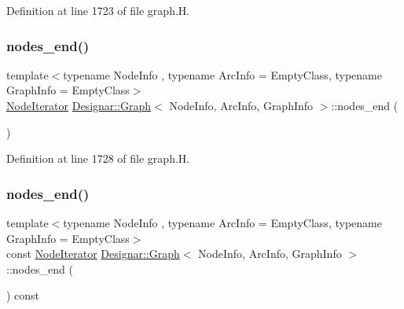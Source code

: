 Definition at line 1723 of file graph.\+H.

\mbox{\label{class_designar_1_1_graph_a9f51b69f8827aabfe5b23f82e9bc5a4d}} 
\subsubsection{\texorpdfstring{nodes\+\_\+end()}{nodes\_end()}\hspace{0.1cm}{\footnotesize\ttfamily [1/2]}}
{\footnotesize\ttfamily template$<$typename Node\+Info , typename Arc\+Info  = Empty\+Class, typename Graph\+Info  = Empty\+Class$>$ \\
\hyperlink{class_designar_1_1_graph_1_1_node_iterator}{Node\+Iterator} \hyperlink{class_designar_1_1_graph}{Designar\+::\+Graph}$<$ Node\+Info, Arc\+Info, Graph\+Info $>$\+::nodes\+\_\+end (\begin{DoxyParamCaption}{ }\end{DoxyParamCaption})\hspace{0.3cm}{\ttfamily [inline]}}



Definition at line 1728 of file graph.\+H.

\mbox{\label{class_designar_1_1_graph_abb7e32a8a05850e788f4017677965b49}} 
\subsubsection{\texorpdfstring{nodes\+\_\+end()}{nodes\_end()}\hspace{0.1cm}{\footnotesize\ttfamily [2/2]}}
{\footnotesize\ttfamily template$<$typename Node\+Info , typename Arc\+Info  = Empty\+Class, typename Graph\+Info  = Empty\+Class$>$ \\
const \hyperlink{class_designar_1_1_graph_1_1_node_iterator}{Node\+Iterator} \hyperlink{class_designar_1_1_graph}{Designar\+::\+Graph}$<$ Node\+Info, Arc\+Info, Graph\+Info $>$\+::nodes\+\_\+end (\begin{DoxyParamCaption}{ }\end{DoxyParamCaption}) const\hspace{0.3cm}{\ttfamily [inline]}}



